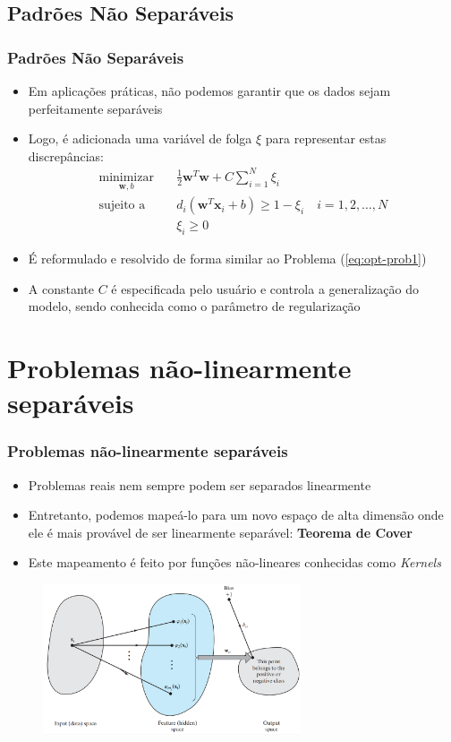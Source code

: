 \documentclass{beamer}
\begin{document}
\subsection{Padrões Não Separáveis}
\begin{frame}
	\frametitle{Padrões Não Separáveis}
	\begin{itemize}
		\item Em aplicações práticas, não podemos garantir que os dados sejam perfeitamente separáveis
		\item Logo, é adicionada uma variável de folga $\xi$ para representar estas discrepâncias:
		\begin{align}
			\underset{\textbf{w},b}{\text{minimizar}} \quad & \frac{1}{2}\textbf{w}^T\textbf{w} + C\sum_{i=1}^{N}\xi_i \\ 
			\text{sujeito a} \quad & d_i(\textbf{w}^T\textbf{x}_i + b) \geq 1 - \xi_i \quad i=1,2,\dots,N   \nonumber \\
			& \xi_i \geq 0 \nonumber
		\end{align} 
		\item É reformulado e resolvido de forma similar ao Problema (\ref{eq:opt-prob1})
		\item A constante $C$ é especificada pelo usuário e controla a generalização do modelo, sendo conhecida como o parâmetro de regularização
	\end{itemize}
	
\end{frame}


\section{Problemas não-linearmente separáveis}
\begin{frame}
	\frametitle{Problemas não-linearmente separáveis}
	\begin{itemize}
		\item Problemas reais nem sempre podem ser separados linearmente
		\item Entretanto, podemos mapeá-lo para um novo espaço de alta dimensão onde ele é mais provável de ser linearmente separável: \textbf{Teorema de Cover} \cite{cover}
		\item Este mapeamento é feito por funções não-lineares conhecidas como \textit{Kernels}
	\end{itemize}
	\begin{figure}[h!]
		\centering
		\includegraphics[width=3in]{fig05.png}
		\label{fig:kernel-trick}
	\end{figure}
\end{frame}
\end{document}
